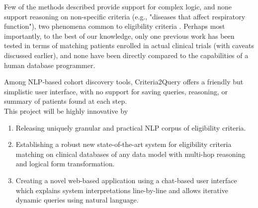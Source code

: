 \documentclass[../main.tex]{subfiles}
\begin{document}
Few of the methods described provide support for complex logic, and none support reasoning on non-specific criteria (e.g., "diseases that affect respiratory function"), two phenomena common to eligibility criteria \cite{wang2017classifying, ross2010analysis}. Perhaps most importantly, to the best of our knowledge, only one previous work has been tested in terms of matching patients enrolled in actual clinical trials \cite{zhang2020deepenroll} (with caveats discussed earlier), and none have been directly compared to the capabilities of a human database programmer. 

Among NLP-based cohort discovery tools, Criteria2Query offers a friendly but simplistic user interface, with no support for saving queries, reasoning, or summary of patients found at each step. \\

\noindent This project will be highly innovative by

\begin{enumerate}
    \itemsep0em 
    \item Releasing uniquely granular and practical NLP corpus of eligibility criteria.
    \item Establishing a robust new state-of-the-art system for eligibility criteria matching on clinical databases of any data model with multi-hop reasoning and logical form transformation.
    \item Creating a novel web-based application using a chat-based user interface which explains system interpretations line-by-line and allows iterative dynamic queries using natural language.
\end{enumerate}
\end{document}
